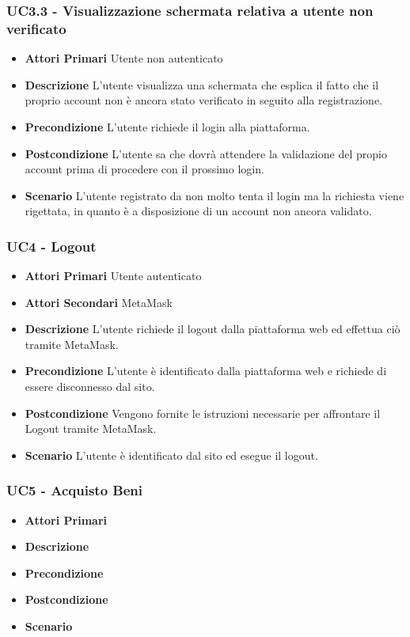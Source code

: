 \subsubsection{UC3.3 - Visualizzazione schermata relativa a utente non verificato}
\begin{itemize}
	\item \textbf{Attori Primari}
	Utente non autenticato
	\item \textbf{Descrizione}
	L'utente visualizza una schermata che esplica il fatto che il proprio account non è ancora stato verificato in seguito alla registrazione.
	\item \textbf{Precondizione}
	L'utente richiede il login alla piattaforma.
	\item \textbf{Postcondizione}
	L'utente sa che dovrà attendere la validazione del propio account prima di procedere con il prossimo login.
	\item \textbf{Scenario}
	L'utente registrato da non molto tenta il login ma la richiesta viene rigettata, in quanto è a disposizione di un account non ancora validato.
\end{itemize}
\subsubsection{UC4 - Logout}
\begin{itemize}
	\item \textbf{Attori Primari}
	Utente autenticato
	\item \textbf{Attori Secondari}
	MetaMask\glo
	\item \textbf{Descrizione}
	L'utente richiede il logout dalla piattaforma web ed effettua ciò tramite MetaMask\glo.
	\item \textbf{Precondizione}
	L'utente è identificato dalla piattaforma web e richiede di essere disconnesso dal sito.
	\item \textbf{Postcondizione}
	Vengono fornite le istruzioni necessarie per affrontare il Logout tramite MetaMask\glo. 
	\item \textbf{Scenario}
	L'utente è identificato dal sito ed esegue il logout.
\end{itemize}
\subsubsection{UC5 - Acquisto Beni}
\begin{itemize}
	\item \textbf{Attori Primari}
	\item \textbf{Descrizione}
	\item \textbf{Precondizione}
	\item \textbf{Postcondizione}
	\item \textbf{Scenario}
\end{itemize}
